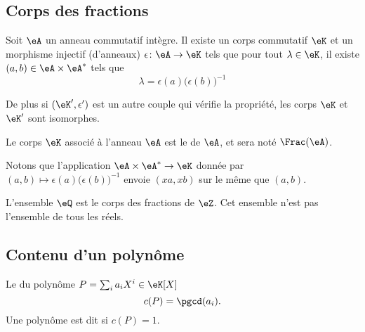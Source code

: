 \subsection{Corps des fractions}

\begin{theorem}     \label{ThogbhWgo}
    Soit \( \eA\) un anneau commutatif intègre. Il existe un corps commutatif \( \eK\) et un morphisme injectif (d'anneaux) \( \epsilon\colon \eA\to \eK\) tels que pour tout \( \lambda\in\eK\), il existe \( (a,b)\in \eA\times \eA^*\) tels que
    \begin{equation}
        \lambda=\epsilon(a)\big( \epsilon(b) \big)^{-1}
    \end{equation}

    De plus si \( (\eK',\epsilon')\) est un autre couple qui vérifie la propriété, les corps \( \eK\) et \( \eK'\) sont isomorphes.
\end{theorem}

\begin{definition}
Le corps \( \eK\) associé à l'anneau \( \eA\) est le  de \( \eA\), et sera noté \( \Frac(\eA)\).
\end{definition}

Notons que l'application \( \eA\times \eA^*\to \eK\) donnée par \( (a,b)\mapsto \epsilon(a)\big( \epsilon(b) \big)^{-1}\) envoie \( (xa,xb)\) sur le même que \( (a,b)\).

L'ensemble \( \eQ\) est le corps des fractions de \( \eZ\). Cet ensemble n'est pas l'ensemble de tous les réels.

\subsection{Contenu d'un polynôme}

\begin{definition}
    Le  du polynôme \( P=\sum_ia_iX^i\in\eK[X]\) 
    \begin{equation}
        c(P)=\pgcd(a_i).
    \end{equation}
    Une polynôme est dit  si \( c(P)=1\).
\end{definition}

